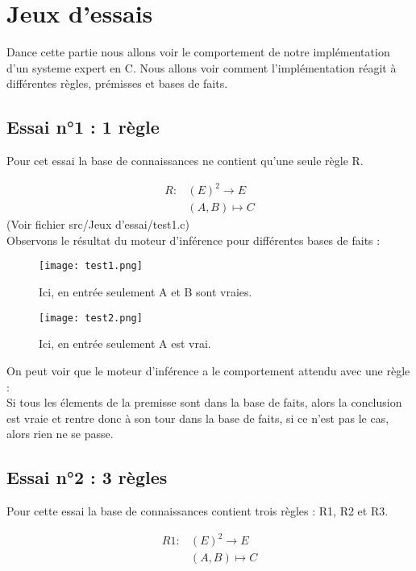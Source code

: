 \documentclass{article}
\begin{document}
\clearpage

\section{Jeux d'essais}
Dance cette partie nous allons voir le comportement de notre implémentation d'un systeme expert en C. Nous allons voir comment l'implémentation réagit à différentes règles, prémisses et bases de faits.

\subsection{Essai n°1 : 1 règle}
Pour cet essai la base de connaissances ne contient qu'une seule règle R.

\begin{align*}
    R : &(E)^2 \longrightarrow E\\ 
    &(A,B) \longmapsto C
\end{align*}
(Voir fichier src/Jeux d'essai/test1.c)\\
Observons le résultat du moteur d'inférence pour différentes bases de faits :


\begin{figure}[h]
\centerline{\texttt{[image: test1.png]}}
\caption{Ici, en entrée seulement A et B sont vraies.}
\label{Test1}
\end{figure}

\begin{figure}[h]
\centerline{\texttt{[image: test2.png]}}
\caption{Ici, en entrée seulement A est vrai.}
\label{Test2}
\end{figure}

On peut voir que le moteur d'inférence a le comportement attendu avec une règle :\\ Si tous les élements de la premisse sont dans la base de faits, alors la conclusion est vraie et rentre donc à son tour dans la base de faits, si ce n'est pas le cas, alors rien ne se passe.

\subsection{Essai n°2 : 3 règles}
Pour cette essai la base de connaissances contient trois règles : R1, R2 et R3.

\begin{align*}
    R1 : &(E)^2 \longrightarrow E\\ 
    &(A,B) \longmapsto C
\end{align*}
\end{document}
